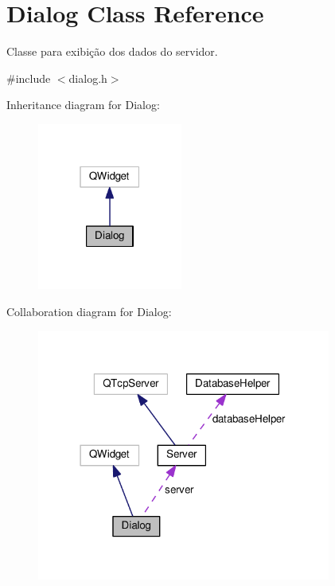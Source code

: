 \hypertarget{classDialog}{}\section{Dialog Class Reference}
\label{classDialog}


Classe para exibição dos dados do servidor.  




{\ttfamily \#include $<$dialog.\+h$>$}



Inheritance diagram for Dialog\+:\nopagebreak
\begin{figure}[H]
\begin{center}
\leavevmode
\includegraphics[width=135pt]{dc/de6/classDialog__inherit__graph}
\end{center}
\end{figure}


Collaboration diagram for Dialog\+:\nopagebreak
\begin{figure}[H]
\begin{center}
\leavevmode
\includegraphics[width=274pt]{df/de8/classDialog__coll__graph}
\end{center}
\end{figure}
